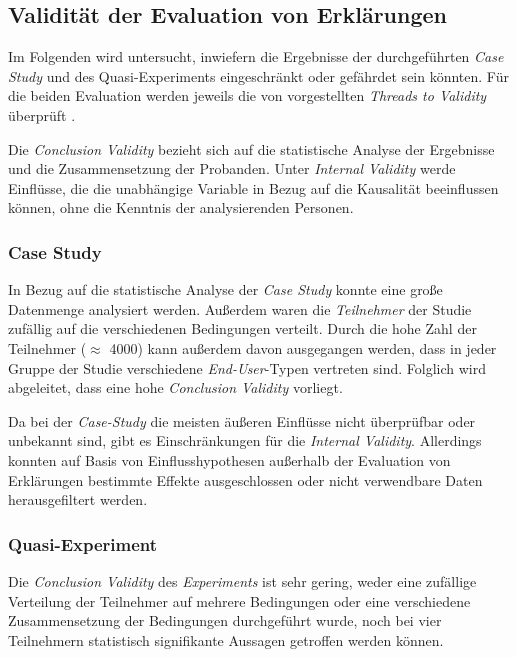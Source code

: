 \subsection{Validität der Evaluation von Erklärungen}

Im Folgenden wird untersucht, inwiefern die Ergebnisse der durchgeführten \textit{Case Study} und des Quasi-Experiments eingeschränkt oder gefährdet sein könnten. Für die beiden Evaluation werden jeweils die von \citeauthor{wohlin2012experimentation} vorgestellten \textit{Threads to Validity} überprüft \cite{wohlin2012experimentation}.

Die \textit{Conclusion Validity} bezieht sich auf die statistische Analyse der Ergebnisse und die Zusammensetzung der Probanden. Unter \textit{Internal Validity} werde Einflüsse, die die unabhängige Variable in Bezug auf die Kausalität beeinflussen können, ohne die Kenntnis der analysierenden Personen.

\subsubsection{Case Study}

In Bezug auf die statistische Analyse der \textit{Case Study} konnte eine große Datenmenge analysiert werden. Außerdem waren die \textit{Teilnehmer} der Studie zufällig auf die verschiedenen Bedingungen verteilt. Durch die hohe Zahl der Teilnehmer ($\approx$ 4000) kann außerdem davon ausgegangen werden, dass in jeder Gruppe der Studie verschiedene \textit{End-User}-Typen vertreten sind. Folglich wird abgeleitet, dass eine hohe \textit{Conclusion Validity} vorliegt.

Da bei der \textit{Case-Study} die meisten äußeren Einflüsse nicht überprüfbar oder unbekannt sind, gibt es Einschränkungen für die \textit{Internal Validity}. Allerdings konnten auf Basis von Einflusshypothesen außerhalb der Evaluation von Erklärungen bestimmte Effekte ausgeschlossen oder nicht verwendbare Daten herausgefiltert werden.

\subsubsection{Quasi-Experiment}

Die \textit{Conclusion Validity} des \textit{Experiments} ist sehr gering, weder eine zufällige Verteilung der Teilnehmer auf mehrere Bedingungen oder eine verschiedene Zusammensetzung der Bedingungen durchgeführt wurde, noch bei vier Teilnehmern statistisch signifikante Aussagen getroffen werden können.

